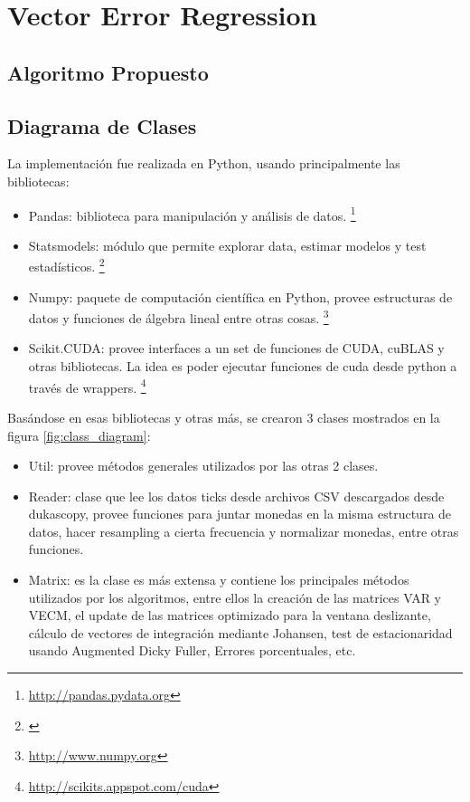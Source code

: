 \section{Vector Error Regression}
\subsection{Algoritmo Propuesto}
\subsection{Diagrama de Clases}

La implementación fue realizada en Python, usando principalmente las bibliotecas:
\begin{itemize}
 \item Pandas: biblioteca para manipulación y análisis de datos. \footnote{\url{http://pandas.pydata.org}}
 \item Statsmodels: módulo que permite explorar data, estimar modelos y test
estadísticos. \footnote{\url{}}
 \item Numpy: paquete de computación científica en Python, provee estructuras
de datos y funciones de álgebra lineal entre otras cosas.
\footnote{\url{http://www.numpy.org}}
 \item Scikit.CUDA: provee interfaces a un set de funciones de CUDA, cuBLAS y
otras bibliotecas. La idea es poder ejecutar funciones de cuda desde python a
través de wrappers. \footnote{\url{http://scikits.appspot.com/cuda}}
\end{itemize}

Basándose en esas bibliotecas y otras más, se crearon 3 clases mostrados en la
figura \ref{fig:class_diagram}:
\begin{itemize}
 \item Util: provee métodos generales utilizados por las otras 2 clases.
 \item Reader: clase que lee los datos ticks desde archivos CSV descargados
desde dukascopy, provee funciones para juntar monedas en la misma estructura de
datos, hacer resampling a cierta frecuencia y normalizar monedas, entre otras
funciones.
 \item Matrix: es la clase es más extensa y contiene los principales métodos
utilizados por los algoritmos, entre ellos la creación de las matrices VAR y
VECM, el update de las matrices optimizado para la ventana deslizante, cálculo
de vectores de integración mediante Johansen, test de estacionaridad usando
Augmented Dicky Fuller, Errores porcentuales, etc.
\end{itemize}

